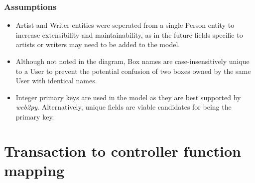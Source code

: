 \documentclass[fontsize=12pt,a4paper]{scrreprt}
\begin{document}
\subsubsection{Assumptions}
\begin{itemize}
  \item \textsf{Artist} and \textsf{Writer} entities were seperated from a single \textsf{Person} entity to increase extensibility and maintainability, as in the future fields specific to artists or writers may need to be added to the model.
  \item Although not noted in the diagram, \textsf{Box} names are case-insensitively unique to a \textsf{User} to prevent the potential confusion of two boxes owned by the same \textsf{User} with identical names.
  \item Integer primary keys are used in the model as they are best supported by \emph{web2py}. Alternatively, unique fields are viable candidates for being the primary key.
\end{itemize}

\section{Transaction to controller function mapping}
\end{document}
